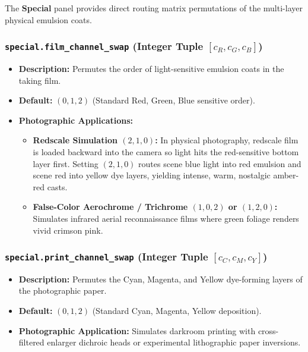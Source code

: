\documentclass[11pt,a4paper]{article}
\begin{document}
The \textbf{Special} panel provides direct routing matrix permutations of the multi-layer physical emulsion coats.

\subsubsection{\texttt{special.film\_channel\_swap} (Integer Tuple \texorpdfstring{$[c_R, c_G, c_B]$}{[c_R, c_G, c_B]})}
\begin{itemize}[leftmargin=*]
    \item \textbf{Description:} Permutes the order of light-sensitive emulsion coats in the taking film.
    \item \textbf{Default:} $(0, 1, 2)$ (Standard Red, Green, Blue sensitive order).
    \item \textbf{Photographic Applications:}
    \begin{itemize}
        \item \textbf{Redscale Simulation $(2, 1, 0)$:}
        In physical photography, redscale film is loaded backward into the camera so light hits the red-sensitive bottom layer first. Setting $(2, 1, 0)$ routes scene blue light into red emulsion and scene red into yellow dye layers, yielding intense, warm, nostalgic amber-red casts.
        \item \textbf{False-Color Aerochrome / Trichrome $(1, 0, 2)$ or $(1, 2, 0)$:}
        Simulates infrared aerial reconnaissance films where green foliage renders vivid crimson pink.
    \end{itemize}
\end{itemize}

\subsubsection{\texttt{special.print\_channel\_swap} (Integer Tuple \texorpdfstring{$[c_C, c_M, c_Y]$}{[c_C, c_M, c_Y]})}
\begin{itemize}[leftmargin=*]
    \item \textbf{Description:} Permutes the Cyan, Magenta, and Yellow dye-forming layers of the photographic paper.
    \item \textbf{Default:} $(0, 1, 2)$ (Standard Cyan, Magenta, Yellow deposition).
    \item \textbf{Photographic Application:} Simulates darkroom printing with cross-filtered enlarger dichroic heads or experimental lithographic paper inversions.
\end{itemize}
\end{document}
